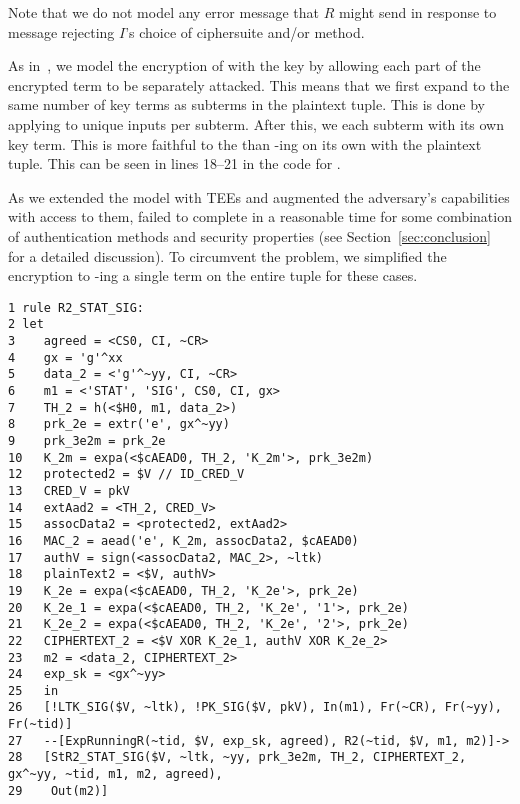 \documentclass[runningheads]{llncs}
\begin{document}
Note that we do not model any error message that $R$ might send in response
to message \mMsgone{} rejecting $I$'s choice of ciphersuite and/or method.
%

As in~\cite{Norr21}, we model the \mXor{} encryption of 
 with
the key  by allowing each part of the encrypted term to be
separately attacked.
%
This means that we first expand  to the same number of key terms 
as
subterms in the plaintext tuple.
%
This is done by applying \mHkdfExpand{} to unique inputs per subterm.
%
After this, we \mXor{} each subterm with its own key term.
%
This is more faithful to the \mSpec{} than \mXor-ing  on its own
with the plaintext tuple.
%
This can be seen in lines 18--21 in the code for .
%

As we extended the model with TEEs and augmented the adversary's 
capabilities
with access to them, \mTamarin{} failed to complete in a reasonable time for
some combination of authentication methods and security properties (see 
Section~\ref{sec:conclusion} for a detailed discussion).
%
To circumvent the problem, we simplified the \mXor{} encryption to 
\mXor-ing 
a
single term on the entire tuple for these cases. \\
%

{\parindent 0pt
\begin{minipage}{\textwidth}
\begin{scriptsize}
\begin{verbatim}
1 rule R2_STAT_SIG:
2 let
3    agreed = <CS0, CI, ~CR>
4    gx = 'g'^xx
5    data_2 = <'g'^~yy, CI, ~CR>
6    m1 = <'STAT', 'SIG', CS0, CI, gx>
7    TH_2 = h(<$H0, m1, data_2>)
8    prk_2e = extr('e', gx^~yy)
9    prk_3e2m = prk_2e
10   K_2m = expa(<$cAEAD0, TH_2, 'K_2m'>, prk_3e2m)
12   protected2 = $V // ID_CRED_V
13   CRED_V = pkV
14   extAad2 = <TH_2, CRED_V>
15   assocData2 = <protected2, extAad2>
16   MAC_2 = aead('e', K_2m, assocData2, $cAEAD0)
17   authV = sign(<assocData2, MAC_2>, ~ltk)
18   plainText2 = <$V, authV>
19   K_2e = expa(<$cAEAD0, TH_2, 'K_2e'>, prk_2e)
20   K_2e_1 = expa(<$cAEAD0, TH_2, 'K_2e', '1'>, prk_2e)
21   K_2e_2 = expa(<$cAEAD0, TH_2, 'K_2e', '2'>, prk_2e)
22   CIPHERTEXT_2 = <$V XOR K_2e_1, authV XOR K_2e_2>
23   m2 = <data_2, CIPHERTEXT_2>
24   exp_sk = <gx^~yy>
25   in
26   [!LTK_SIG($V, ~ltk), !PK_SIG($V, pkV), In(m1), Fr(~CR), Fr(~yy), Fr(~tid)]
27   --[ExpRunningR(~tid, $V, exp_sk, agreed), R2(~tid, $V, m1, m2)]->
28   [StR2_STAT_SIG($V, ~ltk, ~yy, prk_3e2m, TH_2, CIPHERTEXT_2, gx^~yy, ~tid, m1, m2, agreed),
29    Out(m2)]
\end{verbatim}
\end{scriptsize}
\end{minipage}}
\vspace{5mm}
\end{document}
